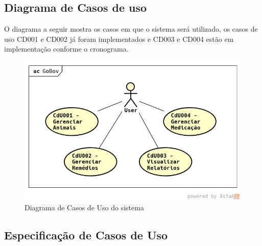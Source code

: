 \documentclass[12pt]{article}
\begin{document}
\subsection{Diagrama de Casos de uso}

O diagrama a seguir mostra os casos em que o sistema será utilizado, os casos de uso CD001 e CD002 já foram implementados e CD003 e CD004 estão em implementação conforme o cronograma.

\begin{figure}[!h]
	\begin{center}
		\caption{Diagrama de Casos de Uso do sistema}
		\includegraphics[width=6in]{img/casosdeuso.png}

	\end{center}
\end{figure}

\newpage

\subsection{Especificação de Casos de Uso}
\end{document}
